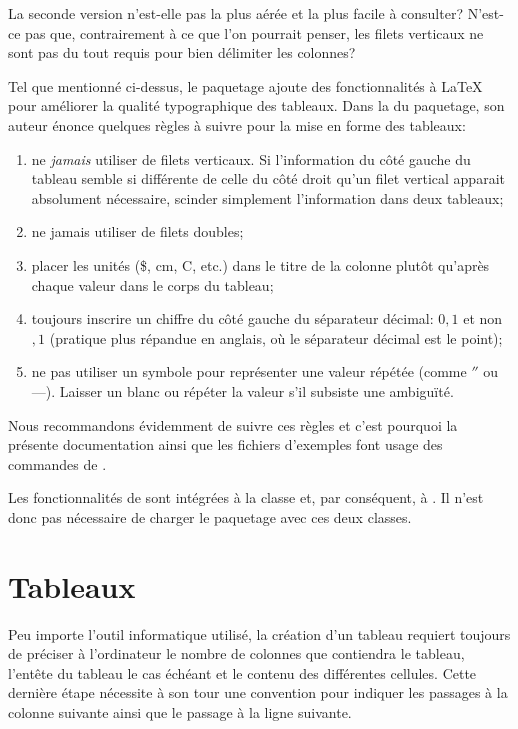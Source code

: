 La seconde version n'est-elle pas la plus aérée et la plus facile à
consulter? N'est-ce pas que, contrairement à ce que l'on pourrait
penser, les filets verticaux ne sont pas du tout requis pour bien
délimiter les colonnes?

Tel que mentionné ci-dessus, le paquetage  ajoute des
fonctionnalités à {\LaTeX} pour améliorer la qualité typographique des
tableaux. Dans la %
du paquetage, son auteur énonce quelques règles à suivre pour la mise
en forme des tableaux:
\begin{enumerate}
\item ne \emph{jamais} utiliser de filets verticaux. Si l'information
  du côté gauche du tableau semble si différente de celle du côté
  droit qu'un filet vertical apparait absolument nécessaire, scinder
  simplement l'information dans deux tableaux;
\item ne jamais utiliser de filets doubles;
\item placer les unités (\$, cm, {\textdegree}C, etc.) dans le titre
  de la colonne plutôt qu'après chaque valeur dans le corps du
  tableau;
\item toujours inscrire un chiffre du côté gauche du séparateur
  décimal: $0,1$ et non $,1$ (pratique plus répandue en anglais, où le
  séparateur décimal est le point);
\item ne pas utiliser un symbole pour représenter une valeur
  répétée (comme $''$ ou ---). Laisser un blanc ou répéter la
  valeur s'il subsiste une ambiguïté.
\end{enumerate}

Nous recommandons évidemment de suivre ces règles et c'est pourquoi la
présente documentation ainsi que les fichiers d'exemples font usage
des commandes de .

Les fonctionnalités de  sont intégrées à la classe
 et, par conséquent, à . Il n'est donc pas
nécessaire de charger le paquetage avec ces deux classes.



\section{Tableaux}
\label{sec:tableaux:tableaux}

Peu importe l'outil informatique utilisé, la création d'un tableau
requiert toujours de préciser à l'ordinateur le nombre de colonnes que
contiendra le tableau, l'entête du tableau le cas échéant et le contenu
des différentes cellules. Cette dernière étape nécessite à son tour
une convention pour indiquer les passages à la colonne suivante
ainsi que le passage à la ligne suivante.

